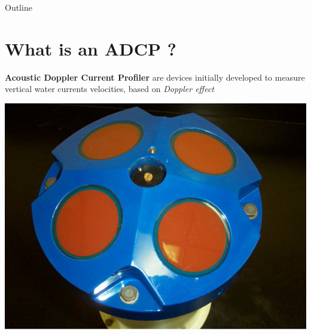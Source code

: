 \documentclass[11pt]{beamer}
\begin{document}

	\begin{frame}{Outline}
		\tableofcontents
	\end{frame}

	\section{What is an ADCP ?}
	\begin{frame}{\secname}
		
		\begin{definition}
			\textbf{Acoustic Doppler Current Profiler} are devices initially developed to measure vertical water currents velocities, based on \emph{Doppler effect}
		\end{definition}
	
		\begin{center}
			\includegraphics[scale=.25]{Adcp_600}
		\end{center}
	\end{frame}
\end{document}
